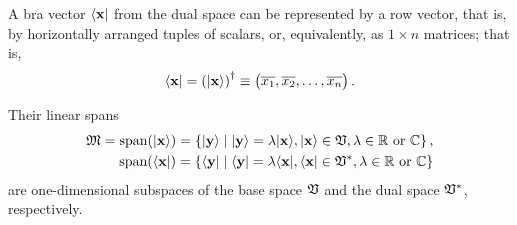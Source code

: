 A bra vector $\langle {\bf x}\vert$  from the dual space
can be represented by a row vector, that is, by horizontally arranged tuples of scalars,
or, equivalently, as $1 \times n$ matrices; that is,
\begin{equation}
\langle {\bf x}   \vert =
\left( \vert {\bf x}\rangle \right )^\dagger
\equiv
\begin{pmatrix}
\overline{x_1},
\overline{x_2},
\ldots ,
\overline{x_n}
\end{pmatrix}
.
\end{equation}

Their linear spans
\begin{equation}
\begin{split}
{\frak M} = \textrm{span} (\vert {\bf x}\rangle )
=
\left\{
\vert {\bf y}\rangle
\mid
\vert {\bf y}\rangle    = \lambda \vert {\bf x}\rangle , \vert {\bf x}\rangle  \in {\frak V}, \lambda \in {\Bbb R}\textrm{ or } {\Bbb C}
\right\}
,\\
\textrm{span} (\langle {\bf x}   \vert  )
=
\left\{
\langle {\bf y}   \vert
\mid
\langle {\bf y}   \vert     = \lambda \langle {\bf x}   \vert  ,  \langle {\bf x}   \vert  \in {\frak V}^\ast, \lambda \in {\Bbb R}\textrm{ or } {\Bbb C}
\right\}
\end{split}
\end{equation}
are one-dimensional subspaces
of the base space ${\frak V}$ and the dual space ${\frak V}^\ast$, respectively.

